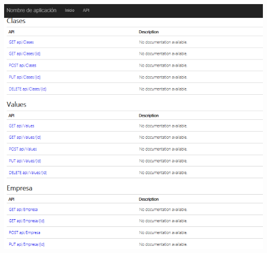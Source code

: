         \begin{center}
			\includegraphics[width=15cm]{./Imagenes/4}
             \end{center}
        

